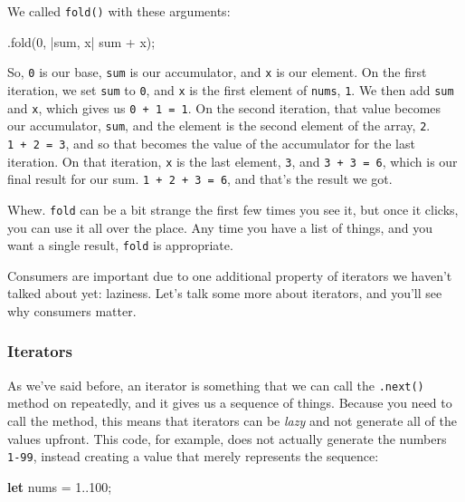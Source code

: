 \documentclass[a4paper,]{book}
\newenvironment{Shaded}{\begin{snugshade}}{\end{snugshade}}
\newcommand{\KeywordTok}[1]{\textcolor[rgb]{0.13,0.29,0.53}{\textbf{{#1}}}}
\newcommand{\DecValTok}[1]{\textcolor[rgb]{0.00,0.00,0.81}{{#1}}}
\newcommand{\NormalTok}[1]{{#1}}
\begin{document}
We called \texttt{fold()} with these arguments:

\begin{Shaded}
\begin{Highlighting}[]
\NormalTok{.fold(}\DecValTok{0}\NormalTok{, |sum, x| sum + x);}
\end{Highlighting}
\end{Shaded}

So, \texttt{0} is our base, \texttt{sum} is our accumulator, and
\texttt{x} is our element. On the first iteration, we set \texttt{sum}
to \texttt{0}, and \texttt{x} is the first element of \texttt{nums},
\texttt{1}. We then add \texttt{sum} and \texttt{x}, which gives us
\texttt{0\ +\ 1\ =\ 1}. On the second iteration, that value becomes our
accumulator, \texttt{sum}, and the element is the second element of the
array, \texttt{2}. \texttt{1\ +\ 2\ =\ 3}, and so that becomes the value
of the accumulator for the last iteration. On that iteration, \texttt{x}
is the last element, \texttt{3}, and \texttt{3\ +\ 3\ =\ 6}, which is
our final result for our sum. \texttt{1\ +\ 2\ +\ 3\ =\ 6}, and that's
the result we got.

Whew. \texttt{fold} can be a bit strange the first few times you see it,
but once it clicks, you can use it all over the place. Any time you have
a list of things, and you want a single result, \texttt{fold} is
appropriate.

Consumers are important due to one additional property of iterators we
haven't talked about yet: laziness. Let's talk some more about
iterators, and you'll see why consumers matter.

\subsubsection{Iterators}\label{iterators}

As we've said before, an iterator is something that we can call the
\texttt{.next()} method on repeatedly, and it gives us a sequence of
things. Because you need to call the method, this means that iterators
can be \emph{lazy} and not generate all of the values upfront. This
code, for example, does not actually generate the numbers \texttt{1-99},
instead creating a value that merely represents the sequence:

\begin{Shaded}
\begin{Highlighting}[]
\KeywordTok{let} \NormalTok{nums = }\DecValTok{1.}\NormalTok{.}\DecValTok{100}\NormalTok{;}
\end{Highlighting}
\end{Shaded}
\end{document}

